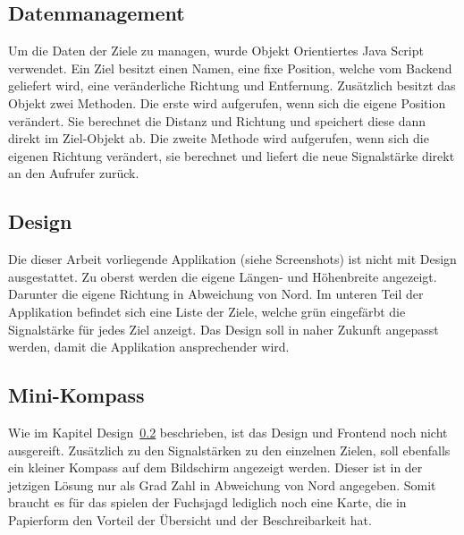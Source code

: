 \subsection{Datenmanagement} %
\label{sub:datenmanagement}
Um die Daten der Ziele zu managen, wurde Objekt Orientiertes Java Script verwendet. Ein Ziel besitzt einen Namen, eine fixe Position, welche vom Backend geliefert wird, eine veränderliche Richtung und Entfernung. Zusätzlich besitzt das Objekt zwei Methoden. Die erste wird aufgerufen, wenn sich die eigene Position verändert. Sie berechnet die Distanz und Richtung und speichert diese dann direkt im Ziel-Objekt ab. Die zweite Methode wird aufgerufen, wenn sich die eigenen Richtung verändert, sie berechnet und liefert die neue Signalstärke direkt an den Aufrufer zurück. 

\subsection{Design} %
\label{sub:design}
Die dieser Arbeit vorliegende Applikation (siehe Screenshots) ist nicht mit Design ausgestattet. Zu oberst werden die eigene Längen- und Höhenbreite angezeigt. Darunter die eigene Richtung in Abweichung von Nord. 
Im unteren Teil der Applikation befindet sich eine Liste der Ziele, welche grün eingefärbt die Signalstärke für jedes Ziel anzeigt. Das Design soll in naher Zukunft angepasst werden, damit die Applikation ansprechender wird.

\subsection{Mini-Kompass} %
\label{sub:mini_kompass}
Wie im Kapitel Design~\ref{sub:design} beschrieben, ist das Design und Frontend noch nicht ausgereift. Zusätzlich zu den Signalstärken zu den einzelnen Zielen, soll ebenfalls ein kleiner Kompass auf dem Bildschirm angezeigt werden. Dieser ist in der jetzigen Lösung nur als Grad Zahl in Abweichung von Nord angegeben. Somit braucht es für das spielen der Fuchsjagd lediglich noch eine Karte, die in Papierform den Vorteil der Übersicht und der Beschreibarkeit hat.

